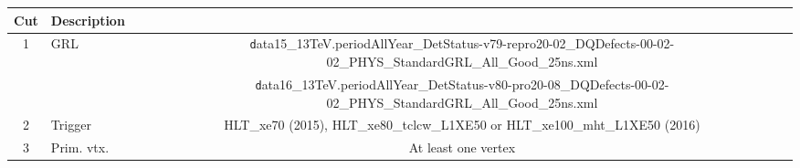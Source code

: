 
\begin{table}[htbp]
  {\small
  \begin{center}\renewcommand\arraystretch{1.4}
   \hspace*{-0.05\textwidth}\begin{tabular}{|c|l|c|c|c|c|c|}
      \hline
      Cut           & Description              & \multicolumn{5}{|c|}{}                                                                                                                              \\
      \hline
      \hline
1                   & GRL                      & \multicolumn{5}{|c|}{{\tiny \texttt data15\_13TeV.periodAllYear\_DetStatus-v79-repro20-02\_DQDefects-00-02-02\_PHYS\_StandardGRL\_All\_Good\_25ns.xml}} \\
                    &                          & \multicolumn{5}{|c|}{{\tiny \texttt data16\_13TeV.periodAllYear\_DetStatus-v80-pro20-08\_DQDefects-00-02-02\_PHYS\_StandardGRL\_All\_Good\_25ns.xml}}   \\ \hline
\multirow{1}{*}{2}  & \multirow{1}{*}{Trigger} & \multicolumn{5}{|c|}{\footnotesize HLT\_xe70 (2015), HLT\_xe80\_tclcw\_L1XE50 or HLT\_xe100\_mht\_L1XE50 (2016)}                                    \\ \hline


3 & Prim. vtx. & \multicolumn{5}{|c|}{At least one vertex} \\ \hline



\end{tabular}
\end{center}}
\end{table}
